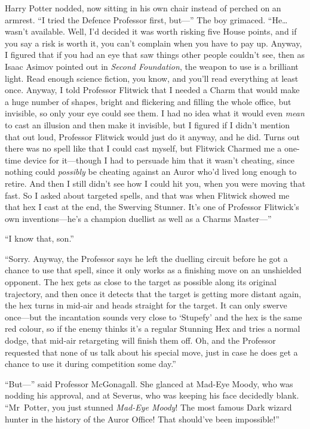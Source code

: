 Harry Potter nodded, now sitting in his own chair instead of perched on an armrest. “I tried the Defence Professor first, but—” The boy grimaced. “He…wasn’t available. Well, I’d decided it was worth risking five House points, and if you say a risk is worth it, you can’t complain when you have to pay up. Anyway, I figured that if you had an eye that saw things other people couldn’t see, then as Isaac Asimov pointed out in \emph{Second Foundation}, the weapon to use is a brilliant light. Read enough science fiction, you know, and you’ll read everything at least once. Anyway, I told Professor Flitwick that I needed a Charm that would make a huge number of shapes, bright and flickering and filling the whole office, but invisible, so only your eye could see them. I had no idea what it would even \emph{mean} to cast an illusion and then make it invisible, but I figured if I didn’t mention that out loud, Professor Flitwick would just do it anyway, and he did. Turns out there was no spell like that I could cast myself, but Flitwick Charmed me a one-time device for it—though I had to persuade him that it wasn’t cheating, since nothing could \emph{possibly} be cheating against an Auror who’d lived long enough to retire. And then I still didn’t see how I could hit you, when you were moving that fast. So I asked about targeted spells, and that was when Flitwick showed me that hex I cast at the end, the Swerving Stunner. It’s one of Professor Flitwick’s own inventions—he’s a champion duellist as well as a Charms Master—”

“I know that, son.”

“Sorry. Anyway, the Professor says he left the duelling circuit before he got a chance to use that spell, since it only works as a finishing move on an unshielded opponent. The hex gets as close to the target as possible along its original trajectory, and then once it detects that the target is getting more distant again, the hex turns in mid-air and heads straight for the target. It can only swerve once—but the incantation sounds very close to ‘Stupefy’ and the hex is the same red colour, so if the enemy thinks it’s a regular Stunning Hex and tries a normal dodge, that mid-air retargeting will finish them off. Oh, and the Professor requested that none of us talk about his special move, just in case he does get a chance to use it during competition some day.”

“But—” said Professor McGonagall. She glanced at Mad-Eye Moody, who was nodding his approval, and at Severus, who was keeping his face decidedly blank. “Mr~Potter, you just stunned \emph{Mad-Eye Moody}! The most famous Dark wizard hunter in the history of the Auror Office! That should’ve been impossible!”

